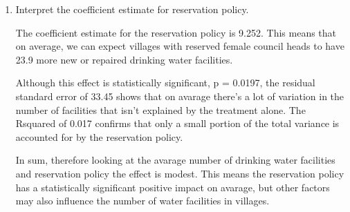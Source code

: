 \documentclass[12pt,letterpaper]{article}
\begin{document}
\begin{enumerate}
\begin{Verbatim}
				\end{Verbatim}
	
	\vspace{6cm}
	\item [(c)] Interpret the coefficient estimate for reservation policy. 
	
	The coefficient estimate for the reservation policy is 9.252. This means that on average, we can expect villages with reserved female council heads to have 23.9 more new or repaired drinking water facilities. 

	Although this effect is statistically significant, p = 0.0197, the residual standard error of 33.45 shows that  on avarage there’s a lot of variation in the number of facilities that isn’t explained by the treatment alone. The Rsquared of 0.017 confirms that only a small portion of the total variance is accounted for by the reservation policy.
	
	In sum, therefore looking at the avarage number of drinking water facilities and reservation policy the effect is modest. This means the reservation policy has a statistically significant positive impact on avarage, but  other factors may also influence the number of water facilities in villages.
	
	
\end{enumerate}



\end{document}
